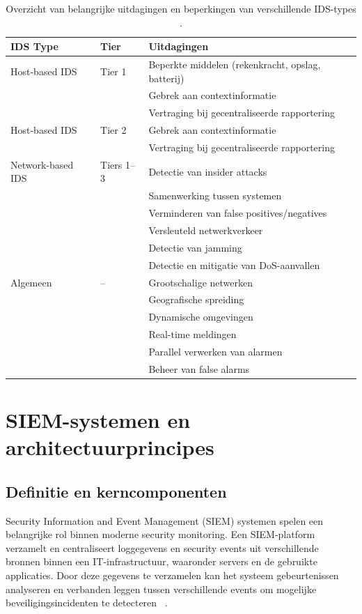 \begin{table}[H]
    \centering
    \begin{tabular}{lll}
        \toprule
        \textbf{IDS Type} & \textbf{Tier} & \textbf{Uitdagingen} \\
        \midrule
        Host-based IDS & Tier 1 & Beperkte middelen (rekenkracht, opslag, batterij) \\
        &    & Gebrek aan contextinformatie \\
        &    & Vertraging bij gecentraliseerde rapportering \\
        \midrule
        Host-based IDS & Tier 2 & Gebrek aan contextinformatie \\
        &    & Vertraging bij gecentraliseerde rapportering \\
        \midrule
        Network-based IDS & Tiers 1–3 & Detectie van insider attacks \\
        &    & Samenwerking tussen systemen \\
        &    & Verminderen van false positives/negatives \\
        &    & Versleuteld netwerkverkeer \\
        &    & Detectie van jamming \\
        &    & Detectie en mitigatie van DoS-aanvallen \\
        \midrule
        Algemeen & -- & Grootschalige netwerken \\
        &    & Geografische spreiding \\
        &    & Dynamische omgevingen \\
        &    & Real-time meldingen \\
        &    & Parallel verwerken van alarmen \\
        &    & Beheer van false alarms \\
        \bottomrule
    \end{tabular}
    \caption[Uitdagingen van IDS-systemen]{Overzicht van belangrijke uitdagingen en beperkingen van verschillende IDS-types \autocite{raponi2019}.}
    \label{tab:ids_challenges}
\end{table}



\section{SIEM-systemen en architectuurprincipes}
\subsection{Definitie en kerncomponenten}
Security Information and Event Management (SIEM) systemen spelen een belangrijke rol binnen moderne security monitoring. Een SIEM-platform verzamelt en centraliseert loggegevens en security events uit verschillende bronnen binnen een IT-infrastructuur, waaronder servers en de gebruikte applicaties. Door deze gegevens te verzamelen kan het systeem gebeurtenissen analyseren en verbanden leggen tussen verschillende events om mogelijke beveiligingsincidenten te detecteren ~\autocite{s21144759}.

